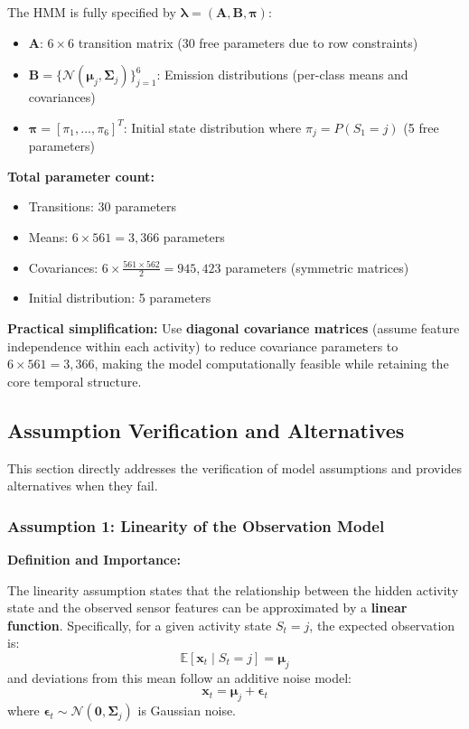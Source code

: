 \documentclass[11pt,a4paper]{article}
\newcommand{\E}{\mathbb{E}}
\newcommand{\bx}{\mathbf{x}}
\newcommand{\bmu}{\boldsymbol{\mu}}
\newcommand{\bSigma}{\boldsymbol{\Sigma}}
\newcommand{\bpi}{\boldsymbol{\pi}}
\newcommand{\blambda}{\boldsymbol{\lambda}}
\newcommand{\bA}{\mathbf{A}}
\newcommand{\bB}{\mathbf{B}}
\newcommand{\bepsilon}{\boldsymbol{\epsilon}}
\begin{document}
The HMM is fully specified by $\blambda = (\bA, \bB, \bpi)$:
\begin{itemize}[leftmargin=*]
    \item $\bA$: $6 \times 6$ transition matrix (30 free parameters due to row constraints)
    \item $\bB = \{\mathcal{N}(\bmu_j, \bSigma_j)\}_{j=1}^{6}$: Emission distributions (per-class means and covariances)
    \item $\bpi = [\pi_1, \ldots, \pi_6]^T$: Initial state distribution where $\pi_j = P(S_1 = j)$ (5 free parameters)
\end{itemize}

\textbf{Total parameter count:}
\begin{itemize}[leftmargin=*]
    \item Transitions: 30 parameters
    \item Means: $6 \times 561 = 3,366$ parameters
    \item Covariances: $6 \times \frac{561 \times 562}{2} = 945,423$ parameters (symmetric matrices)
    \item Initial distribution: 5 parameters
\end{itemize}

\textbf{Practical simplification:} Use \textbf{diagonal covariance matrices} (assume feature independence within each activity) to reduce covariance parameters to $6 \times 561 = 3,366$, making the model computationally feasible while retaining the core temporal structure.

\subsection{Assumption Verification and Alternatives}
\label{sec:assumptions}

This section directly addresses the verification of model assumptions and provides alternatives when they fail.

\subsubsection{Assumption 1: Linearity of the Observation Model}

\textbf{Definition and Importance:}

The linearity assumption states that the relationship between the hidden activity state and the observed sensor features can be approximated by a \textbf{linear function}. Specifically, for a given activity state $S_t = j$, the expected observation is:
\begin{equation}
\E[\bx_t \mid S_t = j] = \bmu_j
\end{equation}
and deviations from this mean follow an additive noise model:
\begin{equation}
\bx_t = \bmu_j + \bepsilon_t
\end{equation}
where $\bepsilon_t \sim \mathcal{N}(\mathbf{0}, \bSigma_j)$ is Gaussian noise.
\end{document}
